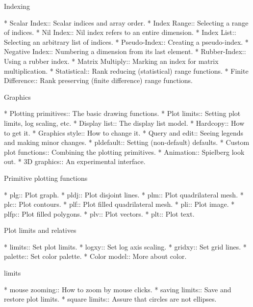 Indexing

* Scalar Index::                Scalar indices and array order.
* Index Range::                 Selecting a range of indices.
* Nil Index::                   Nil index refers to an entire dimension.
* Index List::                  Selecting an arbitrary list of indices.
* Pseudo-Index::                Creating a pseudo-index.
* Negative Index::              Numbering a dimension from its last element.
* Rubber-Index::                Using a rubber index.
* Matrix Multiply::             Marking an index for matrix multiplication.
* Statistical::                 Rank reducing (statistical) range functions.
* Finite Difference::           Rank preserving (finite difference) range functions.

Graphics

* Plotting primitives::         The basic drawing functions.
* Plot limits::                 Setting plot limits, log scaling, etc.
* Display list::                The display list model.
* Hardcopy::                    How to get it.
* Graphics style::              How to change it.
* Query and edit::              Seeing legends and making minor changes.
* pldefault::                   Setting (non-default) defaults.
* Custom plot functions::       Combining the plotting primitives.
* Animation::                   Spielberg look out.
* 3D graphics::                 An experimental interface.

Primitive plotting functions

* plg::                         Plot graph.
* pldj::                        Plot disjoint lines.
* plm::                         Plot quadrilateral mesh.
* plc::                         Plot contours.
* plf::                         Plot filled quadrilateral mesh.
* pli::                         Plot image.
* plfp::                        Plot filled polygons.
* plv::                         Plot vectors.
* plt::                         Plot text.

Plot limits and relatives

* limits::                      Set plot limits.
* logxy::                       Set log axis scaling.
* gridxy::                      Set grid lines.
* palette::                     Set color palette.
* Color model::                 More about color.

limits

* mouse zooming::               How to zoom by mouse clicks.
* saving limits::               Save and restore plot limits.
* square limits::               Assure that circles are not ellipses.


